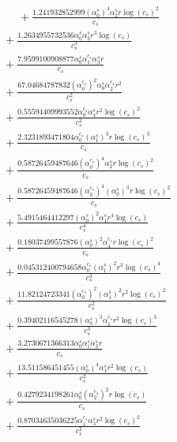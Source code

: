 \documentclass[10pt]{article}
\begin{document}
\begin{align*}
\phantom{R_{2,8}} &\phantom{={}}{}  + \frac{1.241932852999 \left(\alpha_{0}^s\right)^{4} \alpha_{2}^s r \log{\left(c_{s} \right)}^{2}}{c_{s}} \\
&{}  + \frac{1.2634955732536 \alpha_{0}^s \alpha_{3}^s r^{3} \log{\left(c_{s} \right)}}{c_{s}^{3}} \\
&{}  + \frac{7.9599100908877 \alpha_{0}^s \alpha_{1}^{c_s} \alpha_{3}^s r}{c_{s}} \\
&{}  + \frac{67.04684787832 \left(\alpha_{0}^{c_s}\right)^{2} \alpha_{0}^s \alpha_{2}^{c_s} r^{2}}{c_{s}^{2}} \\
&{}  + \frac{0.55594409993552 \alpha_{0}^{c_s} \alpha_{4}^s r^{2} \log{\left(c_{s} \right)}^{2}}{c_{s}^{2}} \\
&{}  + \frac{2.3231893471804 \alpha_{0}^{c_s} \left(\alpha_{1}^s\right)^{3} r \log{\left(c_{s} \right)}^{3}}{c_{s}} \\
&{}  + \frac{0.58726459487646 \left(\alpha_{0}^{c_s}\right)^{4} \alpha_{2}^s r \log{\left(c_{s} \right)}^{2}}{c_{s}} \\
&{}  + \frac{0.58726459487646 \left(\alpha_{0}^{c_s}\right)^{4} \left(\alpha_{0}^s\right)^{3} r \log{\left(c_{s} \right)}^{2}}{c_{s}} \\
&{}  + \frac{5.4915464412297 \left(\alpha_{0}^s\right)^{2} \alpha_{1}^s r^{4} \log{\left(c_{s} \right)}}{c_{s}^{4}} \\
&{}  + \frac{0.18037499557876 \left(\alpha_{0}^s\right)^{2} \alpha_{4}^{c_s} r \log{\left(c_{s} \right)}^{2}}{c_{s}} \\
&{}  + \frac{0.045312400794658 \alpha_{0}^{c_s} \left(\alpha_{1}^s\right)^{2} r^{3} \log{\left(c_{s} \right)}^{4}}{c_{s}^{3}} \\
&{}  + \frac{11.82124723341 \left(\alpha_{0}^{c_s}\right)^{2} \left(\alpha_{1}^s\right)^{2} r^{2} \log{\left(c_{s} \right)}^{2}}{c_{s}^{2}} \\
&{}  + \frac{0.39402116545278 \left(\alpha_{0}^s\right)^{3} \alpha_{1}^{c_s} r^{3} \log{\left(c_{s} \right)}^{3}}{c_{s}^{3}} \\
&{}  + \frac{3.2730671366313 \alpha_{0}^s \alpha_{1}^s \alpha_{3}^s r}{c_{s}} \\
&{}  + \frac{13.511586451455 \left(\alpha_{0}^s\right)^{4} \alpha_{1}^s r^{2} \log{\left(c_{s} \right)}}{c_{s}^{2}} \\
&{}  + \frac{0.4279234198261 \alpha_{0}^s \left(\alpha_{2}^{c_s}\right)^{2} r \log{\left(c_{s} \right)}}{c_{s}} \\
&{}  + \frac{0.87034635036225 \alpha_{1}^{c_s} \alpha_{3}^s r^{2} \log{\left(c_{s} \right)}^{2}}{c_{s}^{2}} \\

\end{align*}
\end{document}
